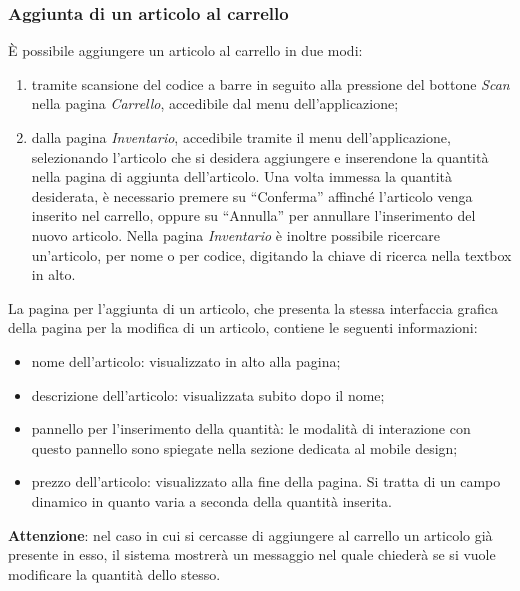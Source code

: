 \documentclass[12pt, a4paper, titlepage]{report}
\begin{document}
	\subsubsection{Aggiunta di un articolo al carrello}
	È possibile aggiungere un articolo al carrello in due modi: 
	\begin{enumerate}
		\item tramite scansione del codice a barre in seguito alla pressione del bottone \textit{Scan} nella pagina \textit{Carrello}, accedibile dal menu dell'applicazione;
		\item dalla pagina \textit{Inventario}, accedibile tramite il menu dell'applicazione, selezionando l'articolo che si desidera aggiungere e inserendone la quantità nella pagina di aggiunta dell'articolo. Una volta immessa la quantità desiderata, è necessario premere su ``Conferma'' affinché l'articolo venga inserito nel carrello, oppure su ``Annulla'' per annullare l'inserimento del nuovo articolo. Nella pagina \textit{Inventario} è inoltre possibile ricercare un'articolo, per nome o per codice, digitando la chiave di ricerca nella textbox in alto.
	\end{enumerate}
	La pagina per l'aggiunta di un articolo, che presenta la stessa interfaccia grafica della pagina per la modifica di un articolo, contiene le seguenti informazioni:
	\begin{itemize}
		\item nome dell'articolo: visualizzato in alto alla pagina;
		\item descrizione dell'articolo: visualizzata subito dopo il nome;
		\item pannello per l'inserimento della quantità: le modalità di interazione con questo pannello sono spiegate nella sezione dedicata al mobile design;
		\item prezzo dell'articolo: visualizzato alla fine della pagina. Si tratta di un campo dinamico in quanto varia a seconda della quantità inserita.
	\end{itemize}
	\textbf{Attenzione}: nel caso in cui si cercasse di aggiungere al carrello un articolo già presente in esso, il sistema mostrerà un messaggio nel quale chiederà se si vuole modificare la quantità dello stesso.
	
\end{document}
